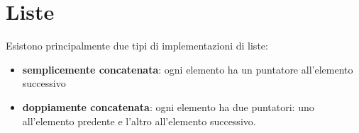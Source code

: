 \chapter{Liste}
Esistono principalmente due tipi di implementazioni di liste:
\begin{itemize}
	\item \textbf{semplicemente concatenata}: ogni elemento ha un puntatore all'elemento successivo
	\item \textbf{doppiamente concatenata}: ogni elemento ha due puntatori: uno all'elemento predente e l'altro all'elemento successivo.
\end{itemize}